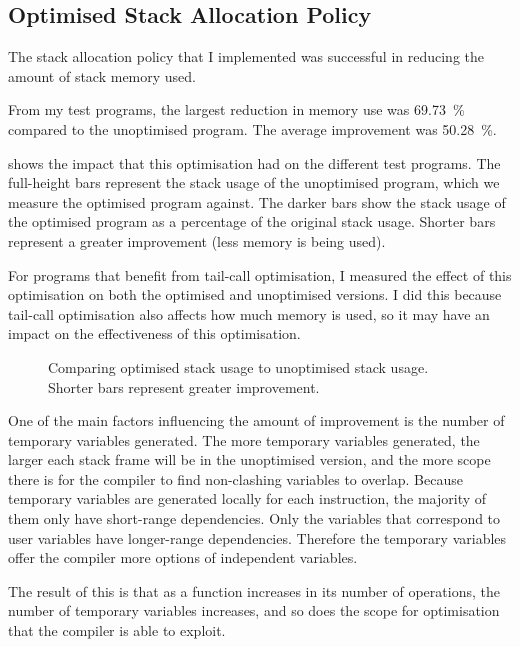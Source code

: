 \documentclass[00-main.tex]{subfiles}
\begin{document}
\subsection{Optimised Stack Allocation Policy}

The stack allocation policy that I implemented was successful in reducing the amount of stack memory used.

From my test programs, the largest reduction in memory use was \SI{69.73}{\percent} compared to the unoptimised program.
The average improvement was \SI{50.28}{\percent}.

 shows the impact that this optimisation had on the different test programs.
The full-height bars represent the stack usage of the unoptimised program, which we measure the optimised program against.
The darker bars show the stack usage of the optimised program as a percentage of the original stack usage.
Shorter bars represent a greater improvement (less memory is being used).

For programs that benefit from tail-call optimisation, I measured the effect of this optimisation on both the optimised and unoptimised versions.
I did this because tail-call optimisation also affects how much memory is used, so it may have an impact on the effectiveness of this optimisation.

\begin{figure}[ht]
  \centering
  \caption{Comparing optimised stack usage to unoptimised stack usage. Shorter bars represent greater improvement.}
  \label{fig:comparing stack usage optimisation across programs}
\end{figure}

One of the main factors influencing the amount of improvement is the number of temporary variables generated.
The more temporary variables generated, the larger each stack frame will be in the unoptimised version, and the more scope there is for the compiler to find non-clashing variables to overlap.
Because temporary variables are generated locally for each instruction, the majority of them only have short-range dependencies.
Only the variables that correspond to user variables have longer-range dependencies.
Therefore the temporary variables offer the compiler more options of independent variables.

The result of this is that as a function increases in its number of operations, the number of temporary variables increases, and so does the scope for optimisation that the compiler is able to exploit.
\end{document}
